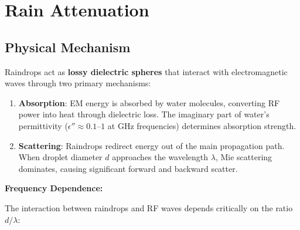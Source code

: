 \section{Rain Attenuation}

\subsection{Physical Mechanism}

Raindrops act as \textbf{lossy dielectric spheres} that interact with electromagnetic waves through two primary mechanisms:

\begin{enumerate}
\item \textbf{Absorption}: EM energy is absorbed by water molecules, converting RF power into heat through dielectric loss. The imaginary part of water's permittivity ($\epsilon'' \approx 0.1$--$1$ at GHz frequencies) determines absorption strength.

\item \textbf{Scattering}: Raindrops redirect energy out of the main propagation path. When droplet diameter $d$ approaches the wavelength $\lambda$, Mie scattering dominates, causing significant forward and backward scatter.
\end{enumerate}

\textbf{Frequency Dependence:}

The interaction between raindrops and RF waves depends critically on the ratio $d/\lambda$:

